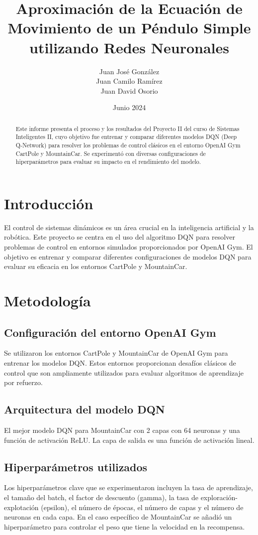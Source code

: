 \documentclass[a4paper,12pt]{article}
\title{Aproximación de la Ecuación de Movimiento de un Péndulo Simple utilizando Redes Neuronales}
\author{Juan José González \\ Juan Camilo Ramírez \\ Juan David Osorio}
\date{Junio 2024}
\begin{document}
\maketitle

\begin{abstract}
    Este informe presenta el proceso y los resultados del Proyecto II del curso de Sistemas Inteligentes II, cuyo objetivo fue entrenar y comparar diferentes modelos DQN (Deep Q-Network) para resolver los problemas de control clásicos en el entorno OpenAI Gym CartPole y MountainCar. Se experimentó con diversas configuraciones de hiperparámetros para evaluar su impacto en el rendimiento del modelo.
\end{abstract}

\section{Introducción}
El control de sistemas dinámicos es un área crucial en la inteligencia artificial y la robótica. Este proyecto se centra en el uso del algoritmo DQN para resolver problemas de control en entornos simulados proporcionados por OpenAI Gym. El objetivo es entrenar y comparar diferentes configuraciones de modelos DQN para evaluar su eficacia en los entornos CartPole y MountainCar.

\section{Metodología}
\subsection{Configuración del entorno OpenAI Gym}
Se utilizaron los entornos CartPole y MountainCar de OpenAI Gym para entrenar los modelos DQN. Estos entornos proporcionan desafíos clásicos de control que son ampliamente utilizados para evaluar algoritmos de aprendizaje por refuerzo.

\subsection{Arquitectura del modelo DQN}
El mejor modelo DQN para MountainCar con 2 capas con 64 neuronas y una función de activación ReLU. La capa de salida es una función de activación lineal.

\subsection{Hiperparámetros utilizados}
Los hiperparámetros clave que se experimentaron incluyen la tasa de aprendizaje, el tamaño del batch, el factor de descuento (gamma), la tasa de exploración-explotación (epsilon), el número de épocas, el número de capas y el número de neuronas en cada capa. En el caso específico de MountainCar se añadió un hiperparámetro para controlar el peso que tiene la velocidad en la recompensa.
\end{document}
